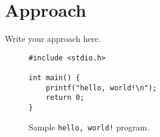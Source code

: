 \section{Approach}
\label{sec:approach}

Write your approach here.

\begin{figure}
\begin{lstlisting}
#include <stdio.h>

int main() {
    printf("hello, world!\n");
    return 0;
}
\end{lstlisting}
\caption{Sample {\tt hello, world!} program.}
\label{fig:hello_world}
\end{figure}